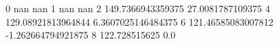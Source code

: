 0 nan nan
1 nan nan
2 149.7366943359375 27.0081787109375
4 129.08921813964844 6.3607025146484375
6 121.46585083007812 -1.262664794921875
8 122.728515625 0.0
